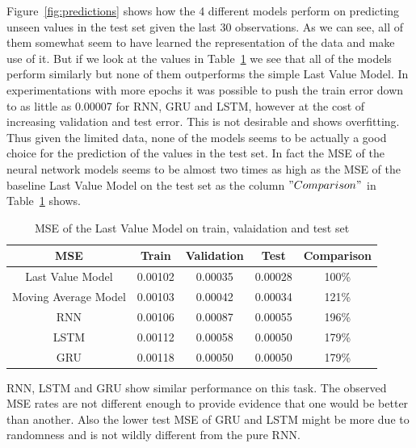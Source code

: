 \documentclass[utf8x]{ctexart}
\begin{document}
Figure~\ref{fig:predictions} shows how the 4 different models perform on predicting unseen values in the test set given the last 30 observations. As we can see, all of them somewhat seem to have learned the representation of the data and make use of it. But if we look at the values in Table~\ref{tab:comparison} we see that all of the models perform similarly but none of them outperforms the simple Last Value Model. In experimentations with more epochs it was possible to push the train error down to as little as 0.00007 for RNN, GRU and LSTM, however at the cost of increasing validation and test error. This is not desirable and shows overfitting. Thus given the limited data, none of the models seems to be actually a good choice for the prediction of the values in the test set. In fact the MSE of the neural network models seems to be almost two times as high as the MSE of the baseline Last Value Model on the test set as the column $"Comparison"$ in Table~\ref{tab:comparison} shows.


\begin{table}[ht]
  \centering
  \caption{MSE of the Last Value Model on train, valaidation and test set}
  \label{tab:comparison}
  \begin{tabular}{c|cccc}
    MSE                  & Train   & Validation & Test    & Comparison \\
    \hline
    Last Value Model     & 0.00102 & 0.00035    & 0.00028 & 100\%      \\
    Moving Average Model & 0.00103 & 0.00042    & 0.00034 & 121\%      \\
    RNN                  & 0.00106 & 0.00087    & 0.00055 & 196\%      \\
    LSTM                 & 0.00112 & 0.00058    & 0.00050 & 179\%      \\
    GRU                  & 0.00118 & 0.00050    & 0.00050 & 179\%      \\
  \end{tabular}
\end{table}

RNN, LSTM and GRU show similar performance on this task. The observed MSE rates are not different enough to provide evidence that one would be better than another. Also the lower test MSE of GRU and LSTM might be more due to randomness and is not wildly different from the pure RNN.
\end{document}
